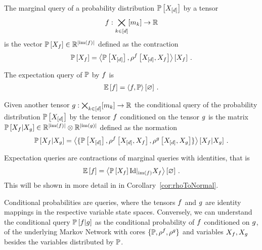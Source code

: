 \begin{definition}\label{def:queries}
	The marginal query of a probability distribution $\mathbb{P}\left[X_{[d]}\right]$ by a tensor
		\[ f : \bigtimes_{k\in[d]}[m_{k}] \rightarrow \mathbb{R} \]
	is the vector $\mathbb{P}\left[X_{f}\right] \in \mathbb{R}^{\left|\mathrm{im}\left(f\right)\right|}$ defined as the contraction
	\begin{align*}
		\mathbb{P}\left[X_{f}\right] = \left\langle \mathbb{P}\left[X_{[d]}\right],\rho^{f}\left[X_{[d]},X_{f}\right]\right\rangle \left[ X_{f} \right] \, .
	\end{align*}
	
	The expectation query of $\mathbb{P}$ by $f$ is 
	\begin{align*}
		\mathbb{E}\left[f\right] = \left\langle f, \mathbb{P}\right\rangle \left[ \varnothing \right] \, . 
	\end{align*}
	
	Given another tensor $g: \bigtimes_{k\in[d]}[m_{k}] \rightarrow \mathbb{R} $ the conditional query of the probability distribution $\mathbb{P}\left[X_{[d]}\right]$ by the tensor $f$ conditioned on the tensor $g$ is the matrix $\mathbb{P}\left[X_{f}|X_{g}\right]\in\mathbb{R}^{\left|\mathrm{im}\left(f\right)\right|}\otimes \mathbb{R}^{\left|\mathrm{im}\left(g\right)\right|}$ defined as the normation
	\begin{align*}
		\mathbb{P}\left[X_{f}|X_{g}\right] 
		= \left\langle \{
		\mathbb{P}\left[X_{[d]}\right],\rho^{f}\left[X_{[d]},X_{f}\right],\rho^{g}\left[X_{[d]},X_{g}\right]
		\}\right\rangle \left[ 
		X_{f} | X_{g}
		 \right] \, . 
	\end{align*}
\end{definition}

Expectation queries are contractions of marginal queries with identities, that is
	\[ \mathbb{E}\left[f\right] = \left\langle \mathbb{P}\left[X_{f}\right] {\mathrm{Id}}|_{\mathrm{im}\left(f\right)}{X_{f}} \right\rangle \left[ \varnothing \right] \, . \]
This will be shown in more detail in  in Corollary~\ref{cor:rhoToNormal}.

Conditional probabilities are queries, where the tensors $f$ and $g$ are identity mappings in the respective variable state spaces.
Conversely, we can understand the conditional query $\mathbb{P}\left[f|g\right]$ as the conditional probability of $f$ conditioned on $g$, of the underlying Markov Network with cores $\{\mathbb{P}, \rho^{f}, \rho^{g} \}$ and variables $X_{f},X_{g}$ besides the variables distributed by $\mathbb{P}$.

